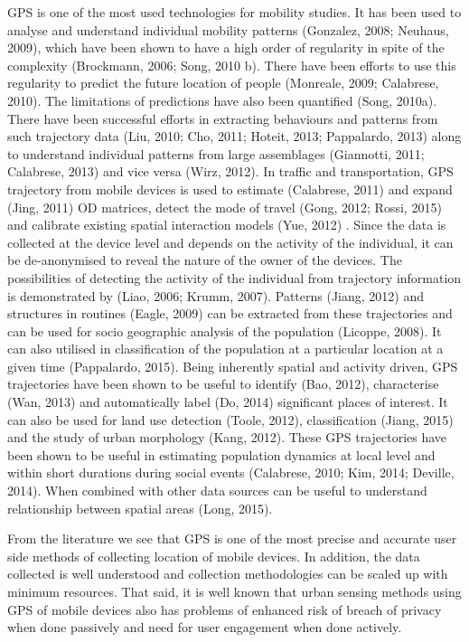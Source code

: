 GPS is one of the most used technologies for mobility studies.
It has been used to analyse and understand individual mobility patterns (Gonzalez, 2008; Neuhaus, 2009), which have been shown to have a high order of regularity in spite of the complexity (Brockmann, 2006; Song, 2010 b).
There have been efforts to use this regularity to predict the future location of people (Monreale, 2009; Calabrese, 2010).
The limitations of predictions have also been quantified (Song, 2010a).
There have been successful efforts in extracting behaviours and patterns from such trajectory data (Liu, 2010; Cho, 2011; Hoteit, 2013; Pappalardo, 2013) along to understand individual patterns from large assemblages (Giannotti, 2011; Calabrese, 2013) and vice versa (Wirz, 2012).
In traffic and transportation, GPS trajectory from mobile devices is used to estimate (Calabrese, 2011) and expand (Jing, 2011) OD matrices, detect the mode of travel (Gong, 2012; Rossi, 2015) and calibrate existing spatial interaction models (Yue, 2012)
.
Since the data is collected at the device level and depends on the activity of the individual, it can be de-anonymised to reveal the nature of the owner of the devices.
The possibilities of detecting the activity of the individual from trajectory information is demonstrated by (Liao, 2006; Krumm, 2007).
Patterns (Jiang, 2012) and structures in routines (Eagle, 2009) can be extracted from these trajectories and can be used for socio geographic analysis of the population (Licoppe, 2008).
It can also utilised in classification of the population at a particular location at a given time (Pappalardo, 2015).
Being inherently spatial and activity driven, GPS trajectories have been shown to be useful to identify (Bao, 2012), characterise (Wan, 2013) and automatically label (Do, 2014) significant places of interest.
It can also be used for land use detection (Toole, 2012), classification (Jiang, 2015) and the study of urban morphology (Kang, 2012).
These GPS trajectories have been shown to be useful in estimating population dynamics at local level and within short durations during social events (Calabrese, 2010; Kim, 2014; Deville, 2014).
When combined with other data sources can be useful to understand relationship between spatial areas (Long, 2015).

From the literature we see that GPS is one of the most precise and accurate user side methods of collecting location of mobile devices.
In addition, the data collected is well understood and collection methodologies can be scaled up with minimum resources.
That said, it is well known that urban sensing methods using GPS of mobile devices also has problems of enhanced risk of breach of privacy when done passively and need for user engagement when done actively.

